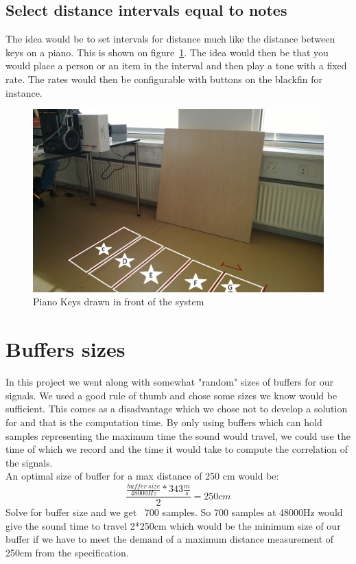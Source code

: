\subsection{Select distance intervals equal to notes}
The idea would be to set intervals for distance much like the distance between keys on a piano. This is shown on figure~\ref{fig:pianokeys}. The idea would then be that you would place a person or an item in the interval and then play a tone with a fixed rate. The rates would then be configurable with buttons on the blackfin for instance.
\begin{figure}[hbpt]
\centering
\includegraphics[scale=0.3]{billeder/pianokeyground}
\caption{Piano Keys drawn in front of the system}
\label{fig:pianokeys}
\end{figure}
\section{Buffers sizes}
In this project we went along with somewhat "random" sizes of buffers for our signals. We used a good rule of thumb and chose some sizes we know would be sufficient. 
This comes as a disadvantage which we chose not to develop a solution for and that is the computation time.
 By only using buffers which can hold samples representing the maximum time the sound would travel, we could use the time of which we record and the time it would take to compute the correlation of the signals.\\
An optimal size of buffer for a max distance of 250 cm would be:\\
\begin{equation}
\frac{\frac{buffer\ size}{48000Hz}*343\frac{m}{s}}{2}=250cm
\end{equation}
Solve for buffer size and we get ~700 samples. So 700 samples at 48000Hz would give the sound time to travel 2*250cm which would be the minimum size of our buffer if we have to meet the demand of a maximum distance measurement of 250cm from the specification.
